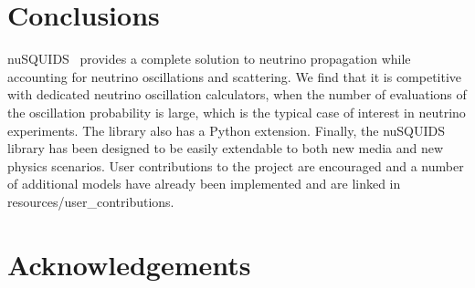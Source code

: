 \documentclass[3p,12pt]{elsarticle}
\newcommand{\ttf}{\ttfamily}
\newcommand{\nuSQUIDS}{{\ttfamily nuSQUIDS}}
\begin{document}
\section{Conclusions}
\label{sec:conclu}

\nuSQUIDS~  provides a complete solution to neutrino propagation while accounting for neutrino oscillations and scattering. 
We find that it is competitive with dedicated neutrino oscillation calculators, when the number of evaluations of the oscillation probability
is large, which is the typical case of interest in neutrino experiments.
The library also has a {\ttf Python} extension. Finally, the \nuSQUIDS~ library has been designed to be easily extendable 
to both new media and new physics scenarios. User contributions to the project are encouraged and a number of additional
models have already been implemented and are linked in {\ttf resources/user\_contributions}.

\section*{Acknowledgements}
\end{document}
